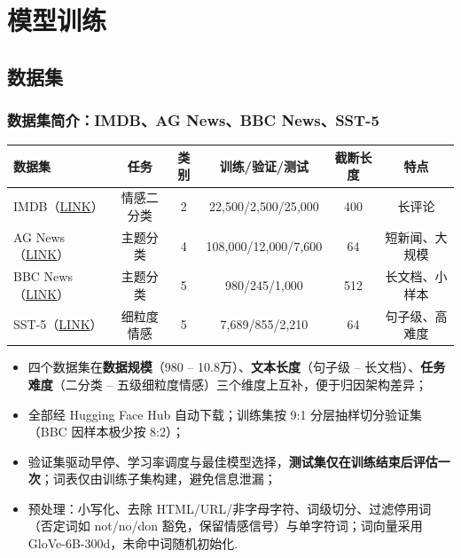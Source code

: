 \documentclass{模版}
\begin{document}
\section{模型训练}
\subsection{数据集}
\begin{frame}
\frametitle{数据集简介：IMDB、AG News、BBC News、SST-5}
\begin{table}[H]
    \centering
    \scriptsize
    \begin{tabular}{lccccc}
        \toprule
        数据集 & 任务 & 类别 & 训练/验证/测试 & 截断长度 & 特点 \\
        \midrule
        IMDB（\href{https://huggingface.co/datasets/stanfordnlp/imdb}{LINK}） & 情感二分类 & 2 & 22{,}500/2{,}500/25{,}000 & 400 & 长评论 \\
        AG News（\href{https://huggingface.co/datasets/fancyzhx/ag_news}{LINK}） & 主题分类 & 4 & 108{,}000/12{,}000/7{,}600 & 64 & 短新闻、大规模 \\
        BBC News（\href{https://huggingface.co/datasets/SetFit/bbc-news}{LINK}） & 主题分类 & 5 & 980/245/1{,}000 & 512 & 长文档、小样本 \\
        SST-5（\href{https://huggingface.co/datasets/SetFit/sst5}{LINK}） & 细粒度情感 & 5 & 7{,}689/855/2{,}210 & 64 & 句子级、高难度 \\
        \bottomrule
    \end{tabular}
\end{table}
\begin{itemize}
    \fontsize{9pt}{11pt}\selectfont
    \item 四个数据集在\textbf{数据规模}（980 -- 10.8万）、\textbf{文本长度}（句子级 -- 长文档）、\textbf{任务难度}（二分类 -- 五级细粒度情感）三个维度上互补，便于归因架构差异；
    \item 全部经 Hugging Face Hub 自动下载；训练集按 9:1 分层抽样切分验证集（BBC 因样本极少按 8:2）；
    \item 验证集驱动早停、学习率调度与最佳模型选择，\textbf{测试集仅在训练结束后评估一次}；词表仅由训练子集构建，避免信息泄漏；
    \item 预处理：小写化、去除 HTML/URL/非字母字符、词级切分、过滤停用词（否定词如 not/no/don 豁免，保留情感信号）与单字符词；词向量采用 GloVe-6B-300d，未命中词随机初始化.
\end{itemize}
\end{frame}
\end{document}
